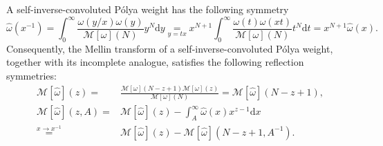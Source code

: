 \documentclass[pdflatex,sn-mathphys-num]{sn-jnl}
\theoremstyle{thmstyleone}
\numberwithin{equation}{section}
\begin{document}
A self-inverse-convoluted P\'olya weight has the following symmetry
\begin{equation}\label{symmetry}
\widehat\omega(x^{-1})=\int_0^\infty  \frac{\omega(y/x)\omega(y)}{\mathcal{M}[\omega](N)} y^{N}\mathrm{d}y\underset{y=tx}{=}x^{N+1}\int_0^\infty \frac{\omega(t)\omega(xt)}{\mathcal{M}[\omega](N)} t^{N} \mathrm{d}t=x^{N+1}\widehat\omega(x).
\end{equation}
Consequently, the Mellin transform of a self-inverse-convoluted P\'olya weight, together with its incomplete analogue, satisfies the following reflection symmetries:
    \begin{align}
    \mathcal{M}\left[\widehat{\omega}\right]\left(z\right)=&\frac{\mathcal{M}\left [ \omega \right ]\left ( N-z+1 \right )\mathcal{M}\left [ \omega \right ]\left ( z \right )}{\mathcal{M}[\omega](N)}=\mathcal{M}\left[\widehat{\omega}\right]\left(N-z+1\right),\label{Mellin.reflect}
        \\
        \mathcal{M}\left[\widehat{\omega}\right]\left(z,A\right)=&\mathcal{M}\left[\widehat{\omega}\right]\left(z\right)-\int_{A}^\infty \widehat{\omega}(x) x^{z-1}\mathrm{d}x\nonumber\\
        \overset{x\to x^{-1}}{=}&\mathcal{M}\left[\widehat{\omega}\right]\left(z\right)-\mathcal{M}\left[\widehat{\omega}\right]\left(N-z+1,A^{-1}\right).\label{Mellin.icomplete.reflect}
    \end{align}
\end{document}
